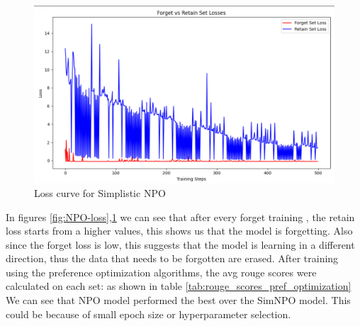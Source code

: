 \documentclass[11pt]{article}
\begin{document}
    \begin{figure}[htbp]
        \centering
        \includegraphics[width=0.9\linewidth]{plot/SimNPO}
        \caption{Loss curve for Simplistic NPO}
        \label{fig:SimNPO-loss}
    \end{figure}
    In figures \ref{fig:NPO-loss},\ref{fig:SimNPO-loss} we can see that after every forget training , the retain loss starts from a higher values, this shows us that the model is forgetting. Also since the forget loss is low, this suggests that the model is learning in a different direction, thus the data that needs to be forgotten are erased.
    After training using the preference optimization algorithms, the avg rouge scores were calculated on each set: as shown in table \ref{tab:rouge_scores_pref_optimization}
    We can see that NPO model performed the best over the SimNPO model. This could be because of small epoch size or hyperparameter selection.
    \begin{table}[htbp]
        \centering
        \caption{Average ROUGE-L Scores for Forget and Retain Sets}
        \label{tab:rouge_scores_pref_optimization}
    \end{table}
\end{document}
